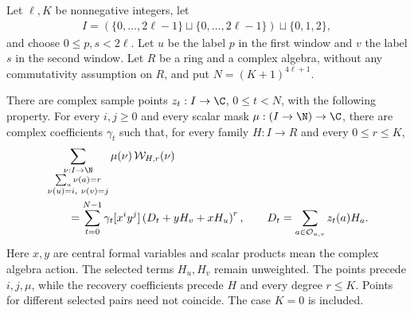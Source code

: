 \begin{lemma}
    \label{thm:two_window_common_scalar_recovery}
    Let $\ell,K$ be nonnegative integers, let
    \begin{align}
        I=(\{0,\ldots,2\ell-1\}\sqcup\{0,\ldots,2\ell-1\})
        \sqcup\{0,1,2\},
        \label{eq:two_window_scalar_alphabet}
    \end{align}
    and choose $0\le p,s<2\ell$.
    Let $u$ be the label $p$ in the first window and $v$ the label $s$ in the
    second window. Let $R$ be a ring and a complex algebra, without any
    commutativity assumption on $R$, and put $N=(K+1)^{4\ell+1}$.

    There are complex sample points $z_t:I\to\C$, $0\le t<N$, with the
    following property. For every $i,j\ge0$ and every scalar mask
    $\mu:(I\to\N)\to\C$, there are complex coefficients $\gamma_t$ such
    that, for every family $H:I\to R$ and every $0\le r\le K$,
    \begin{align}
         & \sum_{\substack{\nu:I\to\N         \\ \sum_a\nu(a)=r\\
                \nu(u)=i,\ \nu(v)=j}}
        \mu(\nu)\,\mathcal W_{H,r}(\nu)\notag \\
         & \qquad=\sum_{t=0}^{N-1}\gamma_t
        [x^iy^j]\left(D_t+yH_v+xH_u\right)^r,
        \qquad D_t=\sum_{a\in\mathcal O_{u,v}}z_t(a)H_a.
        \label{eq:two_window_common_scalar_recovery}
    \end{align}
    Here $x,y$ are central formal variables and scalar products mean the
    complex algebra action. The selected terms $H_u,H_v$ remain unweighted.
    The points precede $i,j,\mu$, while the recovery coefficients precede $H$
    and every degree $r\le K$. Points for different selected pairs need not
    coincide. The case $K=0$ is included.
\end{lemma}
